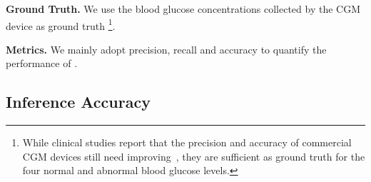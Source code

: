 \begin{table}
  \centering
  \caption{Summary of blood glucose measurements.}
  \label{tab:bgdata}
  \qquad%
\end{table}

\textbf{Ground Truth.}
We use the blood glucose concentrations collected by the CGM device as ground truth \footnote{While clinical studies report that the precision and accuracy of commercial CGM devices still need improving~\cite{bib:JDST10:Vaddiraju}, they are sufficient as ground truth for the four normal and abnormal blood glucose levels.}.

\textbf{Metrics.}
We mainly adopt precision, recall and accuracy to quantify the performance of \sysname.

\subsection{Inference Accuracy}
